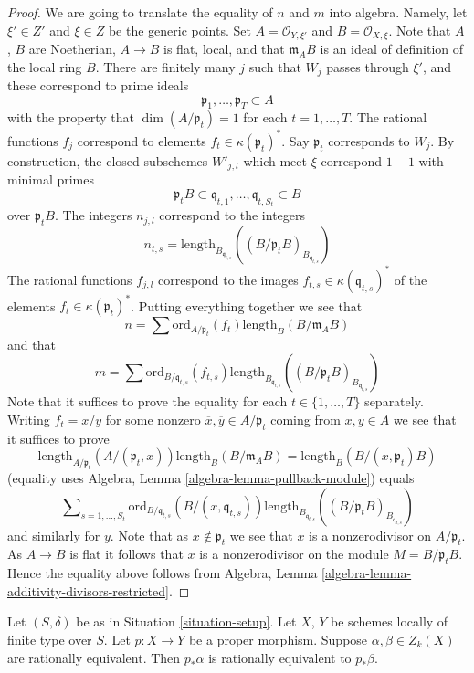 \begin{proof}
\medskip\noindent
We are going to translate the equality of $n$ and $m$ into algebra.
Namely, let $\xi' \in Z'$ and $\xi \in Z$ be the generic points.
Set $A = \mathcal{O}_{Y, \xi'}$ and $B = \mathcal{O}_{X, \xi}$.
Note that $A$, $B$ are Noetherian, $A \to B$ is flat, local,
and that $\mathfrak m_AB$ is an ideal of definition of the local ring $B$.
There are finitely many $j$ such that $W_j$ passes through
$\xi'$, and these correspond to prime ideals
$$
\mathfrak p_1, \ldots, \mathfrak p_T \subset A
$$
with the property that $\dim(A/\mathfrak p_t) = 1$ for each
$t = 1, \ldots, T$. The rational functions $f_j$ correspond
to elements $f_t \in \kappa(\mathfrak p_t)^*$.
Say $\mathfrak p_t$ corresponds to $W_j$.
By construction, the closed subschemes $W'_{j, l}$ which meet
$\xi$ correspond $1 - 1$ with minimal primes
$$
\mathfrak p_tB
\subset
\mathfrak q_{t, 1}, \ldots, \mathfrak q_{t, S_t}
\subset
B
$$
over $\mathfrak p_tB$.
The integers $n_{j, l}$ correspond to the integers
$$
n_{t, s} = \text{length}_{B_{\mathfrak q_{t, s}}}
((B/\mathfrak p_tB)_{B_{\mathfrak q_{t, s}}})
$$
The rational functions $f_{j, l}$ correspond to the images
$f_{t, s} \in \kappa(\mathfrak q_{t, s})^*$ of the elements
$f_t \in \kappa(\mathfrak p_t)^*$. Putting everything together
we see that
$$
n = \sum \text{ord}_{A/\mathfrak p_t}(f_t)\text{length}_B(B/\mathfrak m_AB)
$$
and that
$$
m = \sum \text{ord}_{B/\mathfrak q_{t, s}}(f_{t, s})
\text{length}_{B_{\mathfrak q_{t, s}}}
((B/\mathfrak p_tB)_{B_{\mathfrak q_{t, s}}})
$$
Note that it suffices to prove the equality for each
$t \in \{1, \ldots, T\}$ separately. Writing $f_t = x/y$
for some nonzero $\overline{x}, \overline{y} \in A/\mathfrak p_t$
coming from $x, y\in A$ we see that it suffices
to prove
$$
\text{length}_{A/\mathfrak p_t}(A/(\mathfrak p_t, x))
\text{length}_B(B/\mathfrak m_AB)
=
\text{length}_B(B/(x, \mathfrak p_t)B)
$$
(equality uses Algebra, Lemma \ref{algebra-lemma-pullback-module})
equals
$$
\sum\nolimits_{s = 1, \ldots, S_t}
\text{ord}_{B/\mathfrak q_{t, s}}(B/(x, \mathfrak q_{t, s}))
\text{length}_{B_{\mathfrak q_{t, s}}}
((B/\mathfrak p_tB)_{B_{\mathfrak q_{t, s}}})
$$
and similarly for $y$. Note that as $x \not \in \mathfrak p_t$ we
see that $x$ is a nonzerodivisor on $A/\mathfrak p_t$. As $A \to B$
is flat it follows that $x$ is a nonzerodivisor on the module
$M = B/\mathfrak p_tB$. Hence the equality above follows from
Algebra, Lemma \ref{algebra-lemma-additivity-divisors-restricted}.
\end{proof}

\begin{lemma}
\label{lemma-proper-pushforward-rational-equivalence}
Let $(S, \delta)$ be as in Situation \ref{situation-setup}.
Let $X$, $Y$ be schemes locally of finite type over $S$.
Let $p : X \to Y$ be a proper morphism.
Suppose $\alpha, \beta \in Z_k(X)$ are rationally equivalent.
Then $p_*\alpha$ is rationally equivalent to $p_*\beta$.
\end{lemma}

